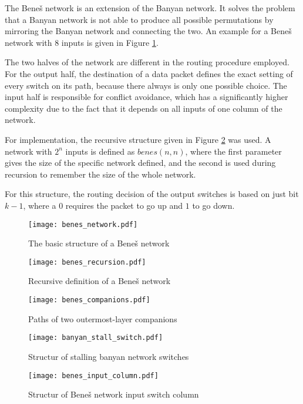 The Beneš network is an extension of the Banyan network.
It solves the problem that a Banyan network is not able to produce all possible permutations by mirroring the Banyan network and connecting the two.
An example for a Beneš network with 8 inputs is given in Figure \ref{fig:benes}.

The two halves of the network are different in the routing procedure employed.
For the output half, the destination of a data packet defines the exact setting of every switch on its path, because there always is only one possible choice.
The input half is responsible for conflict avoidance, which has a significantly higher complexity due to the fact that it depends on all inputs of one column of the network.

For implementation, the recursive structure given in Figure \ref{fig:benes_recursion} was used.
A network with $2^n$ inputs is defined as $benes(n, n)$, where the first parameter gives the size of the specific network defined, and the second is used during recursion to remember the size of the whole network.

For this structure, the routing decision of the output switches is based on just bit $k - 1$, where a $0$ requires the packet to go up and $1$ to go down.

\begin{figure}[!ht]
	\centering
	\texttt{[image: benes\_network.pdf]}
	\caption{The basic structure of a Beneš network}
	\label{fig:benes}
\end{figure}


\begin{figure}[!ht]
	\centering
	\texttt{[image: benes\_recursion.pdf]}
	\caption{Recursive definition of a Beneš network}
	\label{fig:benes_recursion}
\end{figure}

\begin{figure}[!ht]
	\centering
	\texttt{[image: benes\_companions.pdf]}
	\caption{Paths of two outermost-layer companions}
	\label{fig:benes_companions}
\end{figure}

\begin{figure}[!ht]
	\centering
	\texttt{[image: banyan\_stall\_switch.pdf]}
	\caption{Structur of stalling banyan network switches}
	\label{fig:banyan_stall_switch}
\end{figure}

\begin{figure}[!ht]
	\centering
	\texttt{[image: benes\_input\_column.pdf]}
	\caption{Structur of Beneš network input switch column}
	\label{fig:benes_switchcolumn_in}
\end{figure}

